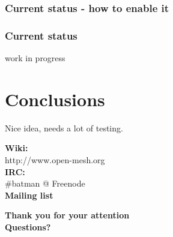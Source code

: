 \documentclass[slidestop]{beamer}
\begin{document}
\begin{frame}[c]
	\frametitle{Current status - how to enable it}
\end{frame}

\begin{frame}[c]
	\frametitle{Current status}
	work in progress
\end{frame}

\section{Conclusions}
\begin{frame}
	Nice idea, needs a lot of testing.

	\textbf{Wiki:}\\
	http://www.open-mesh.org\\
	\textbf{IRC:}\\
	#batman @ Freenode\\
	\textbf{Mailing list}
\end{frame}

\begin{frame}[c]
	\begin{center}
	\Large{\textbf{Thank you for your attention\\[1cm]
	Questions?}}
	\end{center}
\end{frame}
\end{document}
